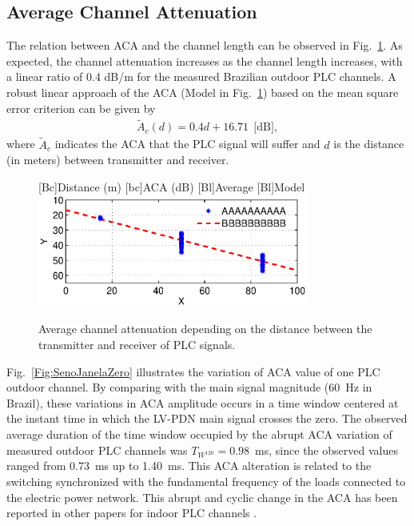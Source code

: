 \documentclass[journal]{IEEEtran}
\newcommand{\tamfig}{3.5in}    %
\begin{document}
	\subsection{Average Channel Attenuation}\label{sec-aca}
	The relation between \ac{ACA} and the channel length can be observed in Fig.~\ref{Fig:ACAxDist}. As expected, the channel attenuation increases as the channel length increases, with a linear ratio of 0.4 dB/m for the measured Brazilian outdoor PLC channels.
	A robust linear approach of the ACA (Model in Fig.~\ref{Fig:ACAxDist}) based on the mean square error criterion can be given by 
	\begin{eqnarray} \label{eq-ACAxDist}
	\widetilde{A}_c(d) = 0.4d +16.71 \   \  \mbox{[dB]},    
	\end{eqnarray}
	where  $\widetilde{A}_c$ indicates the ACA that the PLC signal will suffer and $d$ is the distance (in meters) between transmitter and receiver. 
	
	\begin{figure}[!htp]
		\begin{centering}
			[Bc]{Distance (m)}    
			[bc]{ACA (dB)}
			[Bl]{Average}
			[Bl]{Model}
			\includegraphics[width=\tamfig]{Figuras/ACAxDist.eps}
			\caption{Average channel attenuation depending on the distance between the transmitter and receiver of \ac{PLC} signals.}
			\label{Fig:ACAxDist}
		\end{centering}
	\end{figure}
	
	Fig.~\ref{Fig:SenoJanelaZero} illustrates the variation of \ac{ACA} value of one \ac{PLC} outdoor channel. By comparing with the main signal magnitude ($60$~Hz in Brazil), these variations in ACA amplitude occurs in a time window centered at the instant time in which the \ac{LV-PDN} main signal crosses the zero. The observed average duration of the time window occupied by the abrupt \ac{ACA} variation of measured outdoor PLC channels was $T_{W^{120}} = 0.98$~ms, since the observed values ranged from 0.73~ms up to 1.40~ms. 
	This \ac{ACA} alteration is related to the switching synchronized with the fundamental frequency of the loads connected to the electric power network. This abrupt and cyclic change in the \ac{ACA} has been reported in other papers for indoor \ac{PLC} channels \cite{Corripio2006, Oliveira2017}.
	
\end{document}
